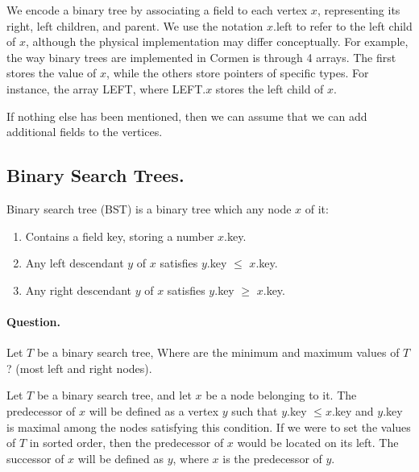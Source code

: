 We encode a binary tree by associating a field to each vertex $x$, representing its right, left children, and parent. We use the notation $x$.left to refer to the left child of $x$, although the physical implementation may differ conceptually. For example, the way binary trees are implemented in Cormen is through 4 arrays. The first stores the value of $x$, while the others store pointers of specific types. For instance, the array LEFT, where LEFT.$x$ stores the left child of $x$.


If nothing else has been mentioned, then we can assume that we can add additional fields to the vertices.


\subsection{Binary Search Trees.} Binary search tree (BST) is a binary tree which any node $x$ of it: 
\begin{enumerate}
  \item Contains a field key, storing a number $x$.key. 
  \item Any left descendant $y$ of $x$ satisfies $y$.key $\le$ $x$.key. 
  \item Any right descendant $y$ of $x$ satisfies $y$.key $\ge$ $x$.key. 
\end{enumerate}

\paragraph{Question.} Let $T$ be a binary search tree, Where are the minimum and maximum values of $T$? (most left and right nodes). 

\begin{definition}
Let $T$ be a binary search tree, and let $x$ be a node belonging to it. The predecessor of $x$ will be defined as a vertex $y$ such that $y$.key $\leq x$.key and $y$.key is maximal among the nodes satisfying this condition. If we were to set the values of $T$ in sorted order, then the predecessor of $x$ would be located on its left. The successor of $x$ will be defined as $y$, where $x$ is the predecessor of $y$.
\end{definition}

